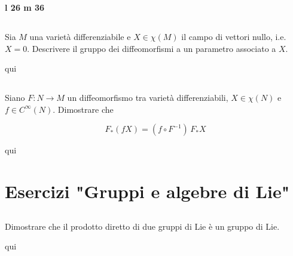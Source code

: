 \textbf{l 26 m 36}

\tocless\section{}\label{es2-33}

\begin{tcolorbox}
	Sia $ M $ una varietà differenziabile e $ X \in \chi(M) $ il campo di vettori nullo, i.e. $ X = 0 $. Descrivere il gruppo dei diffeomorfismi a un parametro associato a $ X $.
\end{tcolorbox}

qui

\tocless\section{}\label{es2-34}

\begin{tcolorbox}
	Siano $ F : N \to M $ un diffeomorfismo tra varietà differenziabili, $ X \in \chi(N) $ e $ f \in C^{\infty}(N) $. Dimostrare che
	
	\begin{equation}
		F_{*}(f X) = (f \circ F^{-1}) \, F_{*} X
	\end{equation}
\end{tcolorbox}

qui

\chapter{Esercizi "Gruppi e algebre di Lie"}

\tocless\section{}\label{es3-1}

\begin{tcolorbox}
	Dimostrare che il prodotto diretto di due gruppi di Lie è un gruppo di Lie.
\end{tcolorbox}

qui

\tocless\section{}\label{es3-2}

